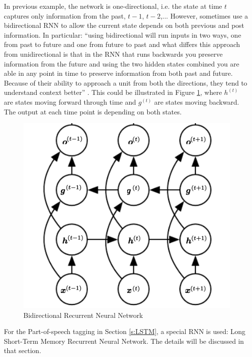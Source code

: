 \documentclass[11pt]{article}
\theoremstyle{plain}
\begin{document}
In previous example, the network is one-directional, i.e. the state at time $t$ 
captures only information from the past, $t-1$, $t-2$,... However, sometimes 
use a bidirectional RNN to allow the current state depends on both previous 
and post information. In particular: ``using bidirectional will run inputs in two 
ways, one from past to future and one from future to past and what differs 
this approach from unidirectional is that in the RNN that runs backwards you 
preserve information from the future and using the two hidden states 
combined you are able in any point in time to preserve information from both 
past and future. Because of their ability to approach a unit from both the 
directions, they tend to understand context better'' 
\cite{aneesh-joshi-LSTM-POS-Tagger}. This could be illustrated in Figure 
\ref{fg:bi-rnn}, where $h^{(t)}$ are states moving forward through time and 
$g^{(t)}$ are states moving backward. The output at each time point is 
depending on both states. 
\begin{figure}[!ht]
	\centering\includegraphics[width=0.7\columnwidth]{images/bi-rnn.png}
	\caption{Bidirectional Recurrent Neural Network 
		\cite{Goodfellow-et-al-2016}}\label{fg:bi-rnn}
\end{figure}

For the Part-of-speech tagging in Section \ref{s:LSTM}, a special RNN is 
used: Long Short-Term Memory Recurrent Neural Network. The details will be 
discussed in that section. 
\end{document}
